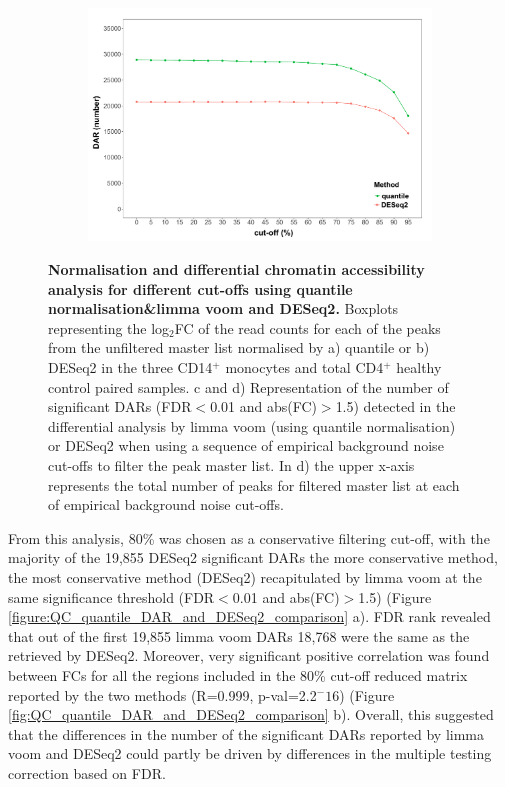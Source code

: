 \begin{figure}[htbp]
\begin{subfigure}{0.5\textwidth}
\includegraphics[width=\textwidth]{./Results1/pdfs/ATAC_Core_CD4vsCD14_DOC_FDR_01_vs_cutoffs_quantile_DESeq2_only}
\caption{\textbf{}}
\end{subfigure}

\caption[Normalisation and differential chromatin accessibility analysis for different cut-offs using quantile normalisation limma voom and DESeq2.]{\textbf{Normalisation and differential chromatin accessibility analysis for different cut-offs using quantile normalisation\&limma voom and DESeq2.} Boxplots representing the log$_2$FC of the read counts for each of the peaks from the unfiltered master list normalised by a) quantile or b) DESeq2 in the three CD14$^+$ monocytes and total CD4$^+$  healthy control paired samples. c and d) Representation of the number of significant DARs (FDR$<$0.01 and abs(FC)$>$1.5) detected in the differential analysis by limma voom (using quantile normalisation) or DESeq2 when using a sequence of empirical background noise cut-offs to filter the peak master list. In d) the upper x-axis represents the total number of peaks for filtered master list at each of empirical background noise cut-offs.}
\label{figure:ATAC_normalisation_and_DARs_limma_DESeq2}
\end{figure} 


From this analysis, 80\% was chosen as a conservative filtering cut-off, with the majority of the 19,855 DESeq2 significant DARs the more conservative method, the most conservative method (DESeq2) recapitulated by limma voom at the same significance threshold (FDR$<$0.01 and abs(FC)$>$1.5) (Figure \ref{figure:QC_quantile_DAR_and_DESeq2_comparison} a). FDR rank revealed that out of the first 19,855 limma voom DARs 18,768 were the same as the retrieved by DESeq2. Moreover, very significant positive correlation was found between FCs for all the regions included in the 80\% cut-off reduced matrix reported by the two methods (R=0.999, p-val=2.2$^-16$) (Figure \ref{fig:QC_quantile_DAR_and_DESeq2_comparison} b). Overall, this suggested that the differences in the number of the significant DARs reported by limma voom and DESeq2 could partly be driven by differences in the multiple testing correction based on FDR.





